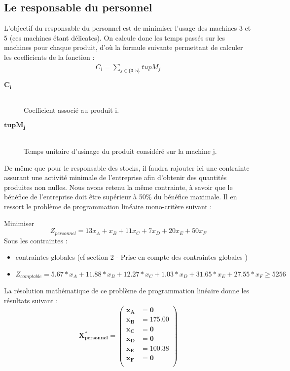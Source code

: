 \documentclass[12pt]{article}
\begin{document}
\subsection{Le responsable du personnel}
L'objectif du responsable du personnel est de minimiser l'usage des machines 3 et 5 (ces machines étant délicates). 
On calcule donc les temps passés sur les machines pour chaque produit, d'où la formule suivante permettant de calculer les coefficients de la fonction : 
\begin{align*} 
 C_{i} = \sum_{j\in\lbrace3;5\rbrace}tupM_{j} 
 \end{align*} 
\begin{description}
\item[$\boldsymbol{C_{i}}$] \hfill\\Coefficient associé au produit i.
\item[$\boldsymbol{tupM_{j}}$]\hfill\\ Temps unitaire d'usinage du produit considéré sur la machine j.
\end{description}
De même que pour le responsable des stocks, il faudra rajouter ici une contrainte assurant une  activité minimale de l'entreprise afin d'obtenir des quantités produites non nulles. Nous avons retenu la même contrainte, à savoir que le bénéfice de l'entreprise doit être supérieur à 50\% du bénéfice maximale.
Il en ressort le problème de programmation linéaire mono-critère suivant :
\begin{tcolorbox}
Minimiser
\begin{equation*}
 Z_{personnel}= 13x_{A} + x_{B} + 11x_{C} + 7x_{D} + 20x_{E} + 50x_{F}
\end{equation*}
Sous les contraintes :
\begin{itemize}
\item contraintes globales (cf section 2 - Prise en compte des contraintes globales )
\item $ Z_{comptable}= 5.67*x_{A} +11.88*x_{B} +12.27*x_{C} +1.03*x_{D} +31.65*x_{E} +27.55*x_{F} \geq 5256$
\end{itemize}
\end{tcolorbox}
La résolution mathématique de ce problème de programmation linéaire donne les résultats suivant :\\
\begin{equation*}
\boldsymbol{X^{*}_{personnel} = 
   \left (
   \begin{aligned}
      x_{A} &= 0 \\
      x_{B} &= 175.00 \\
      x_{C} &= 0 \\
      x_{D} &= 0 \\
      x_{E} &= 100.38 \\ 
      x_{F} &= 0 \\
   \end{aligned}
   \right )
 } 
\end{equation*}
\end{document}
